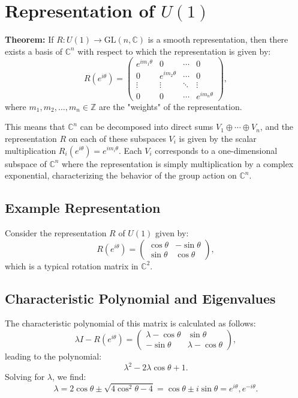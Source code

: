 \documentclass{article}
\begin{document}
\section{Representation of \( U(1) \)}

\textbf{Theorem:} If \( R: U(1) \to \mathrm{GL}(n, \mathbb{C}) \) is a smooth representation, then there exists a basis of \( \mathbb{C}^n \) with respect to which the representation is given by:
\[
R(e^{i\theta}) = \begin{pmatrix}
e^{im_1\theta} & 0 & \cdots & 0 \\
0 & e^{im_2\theta} & \cdots & 0 \\
\vdots & \vdots & \ddots & \vdots \\
0 & 0 & \cdots & e^{im_n\theta}
\end{pmatrix},
\]
where \( m_1, m_2, \ldots, m_n \in \mathbb{Z} \) are the "weights" of the representation.

This means that \( \mathbb{C}^n \) can be decomposed into direct sums \( V_1 \oplus \cdots \oplus V_n \), and the representation \( R \) on each of these subspaces \( V_i \) is given by the scalar multiplication \( R_i(e^{i\theta}) = e^{im_i\theta} \). Each \( V_i \) corresponds to a one-dimensional subspace of \( \mathbb{C}^n \) where the representation is simply multiplication by a complex exponential, characterizing the behavior of the group action on \( \mathbb{C}^n \).

\subsection*{Example Representation}
Consider the representation \( R \) of \( U(1) \) given by:
\[
R(e^{i\theta}) = \begin{pmatrix}
\cos\theta & -\sin\theta \\
\sin\theta & \cos\theta
\end{pmatrix},
\]
which is a typical rotation matrix in \( \mathbb{C}^2 \).

\subsection*{Characteristic Polynomial and Eigenvalues}
The characteristic polynomial of this matrix is calculated as follows:
\[
\lambda I - R(e^{i\theta}) = \begin{pmatrix}
\lambda - \cos\theta & \sin\theta \\
-\sin\theta & \lambda - \cos\theta
\end{pmatrix},
\]
leading to the polynomial:
\[
\lambda^2 - 2\lambda\cos\theta + 1.
\]
Solving for \( \lambda \), we find:
\[
\lambda = 2\cos\theta \pm \sqrt{4\cos^2\theta - 4} = \cos\theta \pm i\sin\theta = e^{i\theta}, e^{-i\theta}.
\]
\end{document}
